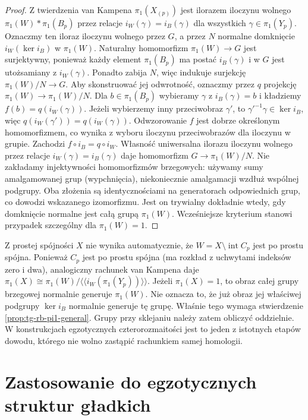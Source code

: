 \begin{proof}
Z twierdzenia van Kampena
$\pi_1(X_{(p)})$ jest ilorazem
iloczynu wolnego $\pi_1(W)*\pi_1(B_p)$
przez relacje $i_W(\gamma)=i_B(\gamma)$
dla wszystkich $\gamma\in\pi_1(Y_p)$.
Oznaczmy ten iloraz iloczynu wolnego przez $G$,
a przez $N$ normalne domknięcie
$i_W(\ker i_B)$ w $\pi_1(W)$.
Naturalny homomorfizm $\pi_1(W)\to G$
jest surjektywny, ponieważ każdy element
$\pi_1(B_p)$ ma postać $i_B(\gamma)$
i w $G$ jest utożsamiany z $i_W(\gamma)$.
Ponadto zabija $N$, więc indukuje
surjekcję $\pi_1(W)/N\to G$.
Aby skonstruować jej odwrotność, oznaczmy
przez $q$ projekcję $\pi_1(W)\to\pi_1(W)/N$.
Dla $b\in\pi_1(B_p)$ wybieramy $\gamma$
z $i_B(\gamma)=b$ i kładziemy
$f(b)=q(i_W(\gamma))$.
Jeżeli wybierzemy inny przeciwobraz $\gamma'$,
to $\gamma'^{-1}\gamma\in\ker i_B$, więc
$q(i_W(\gamma'))=q(i_W(\gamma))$.
Odwzorowanie $f$ jest dobrze określonym
homomorfizmem, co wynika z wyboru
iloczynu przeciwobrazów dla iloczynu w grupie.
Zachodzi $f\circ i_B=q\circ i_W$.
Własność uniwersalna ilorazu iloczynu wolnego
przez relacje $i_W(\gamma)=i_B(\gamma)$ daje
homomorfizm $G\to\pi_1(W)/N$.
Nie zakładamy injektywności homomorfizmów
brzegowych: używamy sumy amalgamowanej grup
(wypchnięcia), niekoniecznie amalgamacji
wzdłuż wspólnej podgrupy. Oba złożenia są
identycznościami na generatorach odpowiednich grup,
co dowodzi wskazanego izomorfizmu.
Jest on trywialny dokładnie wtedy,
gdy domknięcie normalne jest
całą grupą $\pi_1(W)$.
Wcześniejsze kryterium stanowi
przypadek szczególny dla
$\pi_1(W)=1$.
\end{proof}

\begin{uwaga}[Dlaczego $\pi_1(X)=1$ nie wystarcza w dowodzie]
Z prostej spójności $X$ nie wynika automatycznie,
że $W=X\setminus\operatorname{int}C_p$ jest po prostu
spójna. Ponieważ $C_p$ jest po prostu spójna
(ma rozkład z uchwytami indeksów zero i dwa),
analogiczny rachunek van Kampena daje
$\pi_1(X)\cong\pi_1(W)/
\langle\!\langle i_W(\pi_1(Y_p))\rangle\!\rangle$.
Jeżeli $\pi_1(X)=1$, to obraz całej grupy brzegowej
normalnie generuje $\pi_1(W)$. Nie oznacza to,
że już obraz jej właściwej podgrupy
$\ker i_B$ normalnie generuje tę grupę.
Właśnie tego wymaga stwierdzenie
\ref{prop:tg-rb-pi1-general}.
Grupy przy sklejaniu należy zatem obliczyć oddzielnie.
W konstrukcjach egzotycznych czterorozmaitości
jest to jeden z istotnych etapów dowodu, którego
nie wolno zastąpić rachunkiem samej homologii.
\end{uwaga}

\section{Zastosowanie do egzotycznych struktur gładkich}
\label{sec:tg-rb-exotic}

